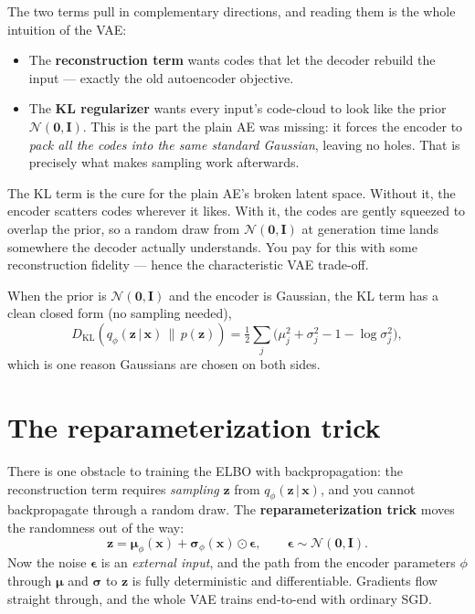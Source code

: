 \documentclass[11pt, oneside]{book}
\newcommand{\KL}[2]{D_{\mathrm{KL}}\!\left(#1 \,\|\, #2\right)}
\newcommand{\eye}{\mathbf{I}}
\newcommand{\zeros}{\mathbf{0}}
\newcommand{\xvec}{\mathbf{x}}
\newcommand{\zvec}{\mathbf{z}}
\newcommand{\Normal}{\mathcal{N}}
\newcommand{\given}{\,\vert\,}
\begin{document}
The two terms pull in complementary directions, and reading them is the whole
intuition of the VAE:
\begin{itemize}
  \item The \textbf{reconstruction term} wants codes that let the decoder rebuild
        the input --- exactly the old autoencoder objective.
  \item The \textbf{KL regularizer} wants every input's code-cloud to look like the
        prior $\Normal(\zeros,\eye)$. This is the part the plain AE was missing:
        it forces the encoder to \emph{pack all the codes into the same standard
        Gaussian}, leaving no holes. That is precisely what makes sampling work
        afterwards.
\end{itemize}

\begin{intbox}
The KL term is the cure for the plain AE's broken latent space. Without it, the
encoder scatters codes wherever it likes. With it, the codes are gently squeezed
to overlap the prior, so a random draw from $\Normal(\zeros,\eye)$ at generation
time lands somewhere the decoder actually understands. You pay for this with some
reconstruction fidelity --- hence the characteristic VAE trade-off.
\end{intbox}

When the prior is $\Normal(\zeros,\eye)$ and the encoder is Gaussian, the KL term
has a clean closed form (no sampling needed),
\[
  \KL{q_{\phi}(\zvec\given\xvec)}{p(\zvec)}
  = \tfrac12 \sum_{j} \bigl(\mu_j^2 + \sigma_j^2 - 1 - \log \sigma_j^2\bigr),
\]
which is one reason Gaussians are chosen on both sides.

\section{The reparameterization trick}

There is one obstacle to training the ELBO with backpropagation: the
reconstruction term requires \emph{sampling} $\zvec$ from $q_{\phi}(\zvec\given
\xvec)$, and you cannot backpropagate through a random draw. The
\textbf{reparameterization trick} moves the randomness out of the way:
\[
  \zvec = \boldsymbol{\mu}_{\phi}(\xvec) + \boldsymbol{\sigma}_{\phi}(\xvec)
          \odot \boldsymbol{\epsilon}, \qquad
  \boldsymbol{\epsilon} \sim \Normal(\zeros, \eye).
\]
Now the noise $\boldsymbol{\epsilon}$ is an \emph{external input}, and the path
from the encoder parameters $\phi$ through $\boldsymbol{\mu}$ and
$\boldsymbol{\sigma}$ to $\zvec$ is fully deterministic and differentiable.
Gradients flow straight through, and the whole VAE trains end-to-end with ordinary
SGD.
\end{document}
